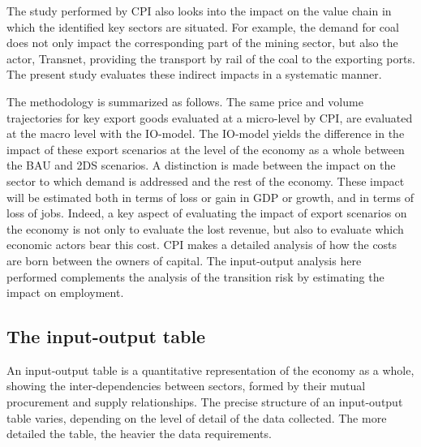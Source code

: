 \documentclass[12pt,english]{article}
\begin{document}
The study performed by CPI also looks into the impact on the value chain in which the identified key sectors are situated. For example, the demand for coal does not only impact the corresponding part of the mining sector, but also the actor, Transnet, providing the transport by rail of the coal to the exporting ports. The present study evaluates these indirect impacts in a systematic manner.

The methodology is summarized as follows. The same price and volume trajectories for key export goods %
evaluated at a micro-level by CPI, are evaluated at the macro level with the IO-model. The IO-model yields the difference in the impact of these export scenarios at the level of the economy as a whole between the BAU and 2DS scenarios. A distinction is made between the impact on the sector to which demand is addressed and the rest of the economy. %
These impact will be estimated both in terms of loss or gain in GDP or growth, and in terms of loss of jobs. Indeed, a key aspect of evaluating the impact of export scenarios on the economy is not only to evaluate the lost revenue, but also to evaluate which economic actors bear this cost. CPI makes a detailed analysis of how the costs are born between the owners of capital. %
The input-output analysis here performed complements the analysis of the transition risk by estimating the impact on employment. 




\subsection{The input-output table}

An input-output table is a quantitative representation of the economy as a whole, showing the inter-dependencies between sectors, formed by their mutual procurement and supply relationships. %
The precise structure of an input-output table varies, %
depending on the level of detail of the data collected. The more detailed the table, the heavier the data requirements. %
\end{document}
